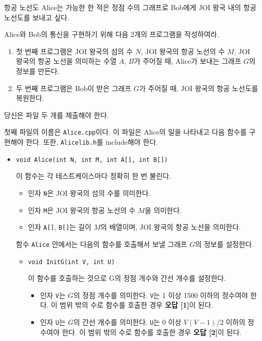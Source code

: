 \begin{problem}{항공 노선도}
	Alice는 가능한 한 적은 정점 수의 그래프로 Bob에게 JOI 왕국 내의 항공 노선도를 보내고 싶다.
	
	Alice와 Bob의 통신을 구현하기 위해 다음 2개의 프로그램을 작성하여라.
	
	\begin{enumerate}
		\item 첫 번째 프로그램은 JOI 왕국의 섬의 수 $N$, JOI 왕국의 항공 노선의 수 $M$, JOI 왕국의 항공 노선을 의미하는 수열 $A$, $B$가 주어질 때, Alice가 보내는 그래프 $G$의 정보를 만든다.
		\item 두 번째 프로그램은 Bob이 받은 그래프 $G$가 주어질 때, JOI 왕국의 항공 노선도를 복원한다. 
	\end{enumerate}

\Specification

당신은 파일 두 개를 제출해야 한다.

첫째 파일의 이름은 \texttt{Alice.cpp}이다. 이 파일은 Alice의 일을 나타내고 다음 함수를 구현해야 한다. 또한, \texttt{Alicelib.h}를 include해야 한다.

\begin{itemize}
	\item \texttt{void Alice(int N, int M, int A[], int B[])}
	
	이 함수는 각 테스트케이스마다 정확히 한 번 불린다.
	
	\begin{itemize}
		\item 인자 \texttt{N}은 JOI 왕국의 섬의 수를 의미한다.
		\item 인자 \texttt{M}은 JOI 왕국의 항공 노선의 수 $M$을 의미한다.
		\item 인자 \texttt{A[]}, \texttt{B[]}는 길이 $M$의 배열이며, JOI 왕국의 항공 노선을 의미한다.
	\end{itemize}
	
	함수 \texttt{Alice} 안에서는 다음의 함수를 호출해서 보낼 그래프 $G$의 정보를 설정한다.
	
	\begin{itemize}
	\item \texttt{void InitG(int V, int U)}
	
	이 함수를 호출하는 것으로 G의 정점 개수와 간선 개수를 설정한다.
	
	\begin{itemize}
		\item 인자 \texttt{V}는 $G$의 정점 개수를 의미한다. \texttt{V}는 1 이상 1500 이하의 정수여야 한다. 이 범위 밖의 수로 함수를 호출한 경우 \textbf{오답 [1]}이 된다.
		\item 인자 \texttt{U}는 $G$의 간선 개수를 의미한다. \texttt{U}는 0 이상 $V(V-1)/2$ 이하의 정수여야 한다. 이 범위 밖의 수로 함수를 호출한 경우 \textbf{오답 [2]}이 된다.
	\end{itemize}


\end{itemize}
\end{itemize}
\end{problem}
